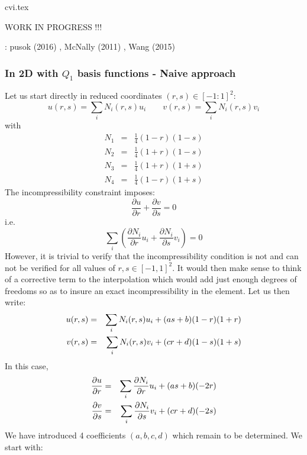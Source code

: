 \begin{flushright} {\tiny {\color{gray} cvi.tex}} \end{flushright}

WORK IN PROGRESS !!!


\Literature: pusok \etal (2016) \cite{pukp16}, McNally (2011) \cite{mcna11}, Wang \etal (2015) \cite{waav15}

\subsubsection{In 2D with $Q_1$ basis functions - Naive approach}

Let us start directly in reduced coordinates $(r,s)\in [-1:1]^2$:
\[
u(r,s)=\sum_i N_i(r,s) u_i
\quad
\quad
v(r,s)=\sum_i N_i(r,s) v_i
\]
with 
\begin{eqnarray}
N_1&=& \frac{1}{4}(1-r)(1-s)  \nonumber\\ 
N_2&=& \frac{1}{4}(1+r)(1-s)  \nonumber\\ 
N_3&=& \frac{1}{4}(1+r)(1+s)  \nonumber\\ 
N_4&=& \frac{1}{4}(1-r)(1+s)  \nonumber
\end{eqnarray}
The incompressibility constraint imposes:
\[
\frac{\partial u}{\partial r}+
\frac{\partial v}{\partial s}=0
\]
i.e.
\[
\sum_i \left(  
\frac{\partial N_i}{\partial r} u_i+
\frac{\partial N_i}{\partial s} v_i
\right)
=0
\]
However, it is trivial to verify that the incompressibility 
condition is not and can not be verified for all values of  
$r,s \in [-1,1]^2$.
It would then make sense to think of a corrective term to the interpolation
which would add just enough degrees of freedoms so as to insure an exact
incompressibility in the element. 
Let us then write:
\begin{eqnarray}
u(r,s)&=&\sum_i N_i(r,s) u_i + (a s + b)(1-r)(1+r) \nonumber\\
v(r,s)&=&\sum_i N_i(r,s) v_i + (c r + d)(1-s)(1+s) \nonumber
\end{eqnarray}
In this case,
\begin{eqnarray}
\frac{\partial u}{\partial r}&=&\sum_i \frac{\partial N_i}{\partial r} u_i + (a s + b) (-2r) \nonumber\\
\frac{\partial v}{\partial s}&=&\sum_i \frac{\partial N_i}{\partial s} v_i + (c r + d)(-2s) \nonumber
\end{eqnarray}
We have introduced 4 coefficients  $(a,b,c,d)$ which remain to be determined. 
We start with:
